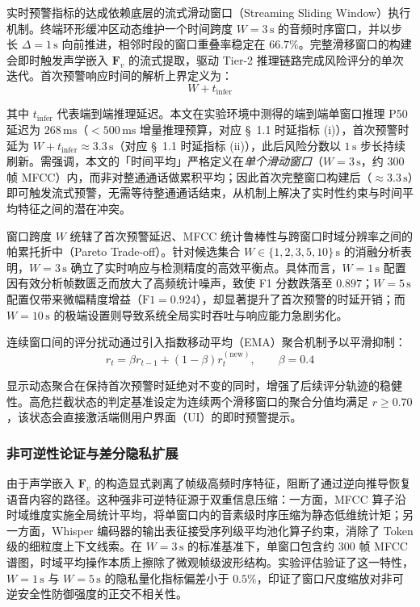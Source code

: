 \documentclass[11pt, a4paper]{article}
\begin{document}
实时预警指标的达成依赖底层的流式滑动窗口（Streaming Sliding Window）执行机制。终端环形缓冲区动态维护一个时间跨度 $W=3\,\mathrm{s}$ 的音频时序窗口，并以步长 $\Delta=1\,\mathrm{s}$ 向前推进，相邻时段的窗口重叠率稳定在 $66.7\%$。完整滑移窗口的构建会即时触发声学嵌入 $\bm{F}_v$ 的流式提取，驱动 Tier-2 推理链路完成风险评分的单次迭代。首次预警响应时间的解析上界定义为：
\begin{equation}
\label{eq:latency_bound}
    W + t_{\mathrm{infer}}
\end{equation}

其中 $t_{\mathrm{infer}}$ 代表端到端推理延迟。本文在实验环境中测得的端到端单窗口推理 P50 延迟为 $268\,\mathrm{ms}$（$<500\,\mathrm{ms}$ 增量推理预算，对应 \S~1.1 时延指标 (i)），首次预警时延为 $W+t_{\mathrm{infer}}\approx 3.3\,\mathrm{s}$（对应 \S~1.1 时延指标 (ii)），此后风险分数以 $1\,\mathrm{s}$ 步长持续刷新。需强调，本文的「时间平均」严格定义在\emph{单个滑动窗口}（$W=3\,\mathrm{s}$，约 $300$ 帧 MFCC）内，而非对整通通话做累积平均；因此首次完整窗口构建后（$\approx 3.3\,\mathrm{s}$）即可触发流式预警，无需等待整通通话结束，从机制上解决了实时性约束与时间平均特征之间的潜在冲突。

窗口跨度 $W$ 统辖了首次预警延迟、MFCC 统计鲁棒性与跨窗口时域分辨率之间的帕累托折中（Pareto Trade-off）。针对候选集合 $W\in\{1,2,3,5,10\}\,\mathrm{s}$ 的消融分析表明，$W=3\,\mathrm{s}$ 确立了实时响应与检测精度的高效平衡点。具体而言，$W=1\,\mathrm{s}$ 配置因有效分析帧数匮乏而放大了高频统计噪声，致使 F1 分数跌落至 $0.897$；$W=5\,\mathrm{s}$ 配置仅带来微幅精度增益（$\text{F1}=0.924$），却显著提升了首次预警的时延开销；而 $W=10\,\mathrm{s}$ 的极端设置则导致系统全局实时吞吐与响应能力急剧劣化。

连续窗口间的评分扰动通过引入指数移动平均（EMA）聚合机制予以平滑抑制：
\begin{equation}
\label{eq:ema_risk}
    r_t = \beta r_{t-1} + (1-\beta)r_t^{(\mathrm{new})}, \qquad \beta=0.4
\end{equation}

显示动态聚合在保持首次预警时延绝对不变的同时，增强了后续评分轨迹的稳健性。高危拦截状态的判定基准设定为连续两个滑移窗口的聚合分值均满足 $r\ge 0.70$，该状态会直接激活端侧用户界面（UI）的即时预警提示。

\subsubsection{非可逆性论证与差分隐私扩展}

由于声学嵌入 $\bm{F}_v$ 的构造显式剥离了帧级高频时序特征，阻断了通过逆向推导恢复语音内容的路径。这种强非可逆特征源于双重信息压缩：一方面，MFCC 算子沿时域维度实施全局统计平均，将单窗口内的音素级时序压缩为静态低维统计矩；另一方面，Whisper 编码器的输出表征接受序列级平均池化算子约束，消除了 Token 级的细粒度上下文线索。在 $W=3\,\mathrm{s}$ 的标准基准下，单窗口包含约 $300$ 帧 MFCC 谱图，时域平均操作本质上擦除了微观帧级波形结构。实验评估验证了这一特性，$W=1\,\mathrm{s}$ 与 $W=5\,\mathrm{s}$ 的隐私量化指标偏差小于 $0.5\%$，印证了窗口尺度缩放对非可逆安全性防御强度的正交不相关性。
\end{document}
